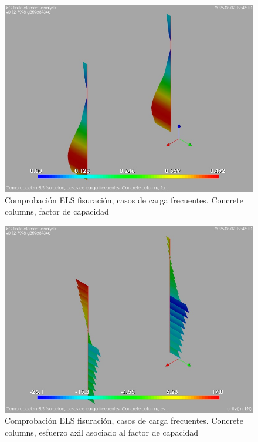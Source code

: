 \begin{figure}[ht]
\begin{center}
\includegraphics[width=\linewidth]{results/graphics/crackingSLS_freq/columnZconcrCF}
\caption{Comprobación ELS fisuración, casos de carga frecuentes. Concrete columns, factor de capacidad}
\label{SLS_frequentLoadsCrackControlcolumnZconcrCF}
\end{center}
\end{figure}
\begin{figure}[ht]
\begin{center}
\includegraphics[width=\linewidth]{results/graphics/crackingSLS_freq/columnZconcrN}
\caption{Comprobación ELS fisuración, casos de carga frecuentes. Concrete columns, esfuerzo axil asociado al factor de capacidad}
\label{SLS_frequentLoadsCrackControlcolumnZconcrN}
\end{center}
\end{figure}
